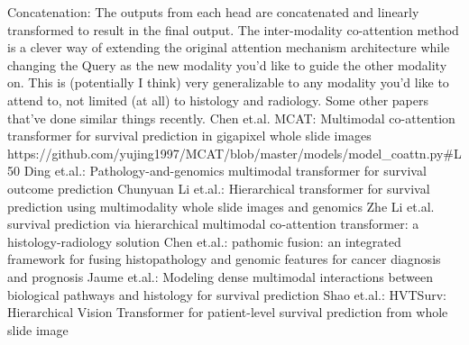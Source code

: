 \documentclass{article}%
\begin{document}
\newline%
\newline%
%
Concatenation: The outputs from each head are concatenated and linearly transformed to result in the final output.%
\newline%
\newline%
%
The inter{-}modality co{-}attention method is a clever way of extending the original attention mechanism architecture while changing the Query as the new modality you’d like to guide the other modality on.%
\newline%
\newline%
%
This is (potentially I think) very generalizable to any modality you’d like to attend to, not limited (at all) to histology and radiology. %
\newline%
\newline%
%
Some other papers that’ve done similar things recently. %
\newline%
\newline%
%
Chen et.al. MCAT: Multimodal co{-}attention transformer for survival prediction in gigapixel whole slide images 	%
\newline%
\newline%
%
https://github.com/yujing1997/MCAT/blob/master/models/model\_coattn.py\#L50 %
\newline%
\newline%
%
Ding et.al.: Pathology{-}and{-}genomics multimodal transformer for survival outcome prediction %
\newline%
\newline%
%
Chunyuan Li et.al.: Hierarchical transformer for survival prediction using multimodality whole slide images and genomics %
\newline%
\newline%
%
Zhe Li et.al. survival prediction via hierarchical multimodal co{-}attention transformer: a histology{-}radiology solution %
\newline%
\newline%
%
Chen et.al.: pathomic fusion: an integrated framework for fusing histopathology and genomic features for cancer diagnosis and prognosis %
\newline%
\newline%
%
Jaume et.al.: Modeling dense multimodal interactions between biological pathways and histology for survival prediction %
\newline%
\newline%
%
Shao et.al.: HVTSurv: Hierarchical Vision Transformer for patient{-}level survival prediction from whole slide image%
\end{document}
